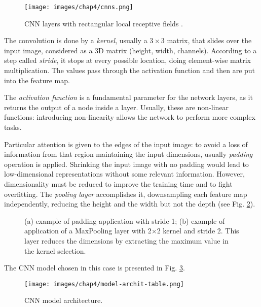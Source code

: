 \begin{figure}[h!]
    \centering
    \texttt{[image: images/chap4/cnns.png]}
    \caption{CNN layers with rectangular local receptive fields \cite{CNN-book}.}
    \label{fig:CNNs}
\end{figure}

The convolution is done by a \textit{kernel}, usually a $3\times3$ matrix, that slides over the input image, considered as a 3D matrix (height, width, channels). According to a step called \textit{stride}, it stops at every possible location, doing element-wise matrix multiplication. The values pass through the activation function and then are put into the feature map. 

The \textit{activation function} is a fundamental parameter for the network layers, as it returns the output of a node inside a layer. Usually, these are non-linear functions: introducing non-linearity allows the network to perform more complex tasks. 

Particular attention is given to the edges of the input image: to avoid a loss of information from that region maintaining the input dimensions, usually \textit{padding} operation is applied. Shrinking the input image with no padding would lead to low-dimensional representations without some relevant information. However, dimensionality must be reduced to improve the training time and to fight overfitting. The \textit{pooling layer} accomplishes it, downsampling each feature map independently, reducing the height and the width but not the depth (see Fig. \ref{fig:padd-pool}).

\begin{figure}[h!]
    \centering
    \hfil
    \caption{(a) example of padding application with stride 1; (b) example of application of a MaxPooling layer with 2$\times$2 kernel and stride 2. This layer reduces the dimensions by extracting the maximum value in the kernel selection.}
    \label{fig:padd-pool}
\end{figure}

The CNN model chosen in this case is presented in Fig. \ref{fig:model-archit}. 

\begin{figure}[h!]
    \centering
    \texttt{[image: images/chap4/model-archit-table.png]}
    \caption{CNN model architecture.}
    \label{fig:model-archit}
\end{figure}

